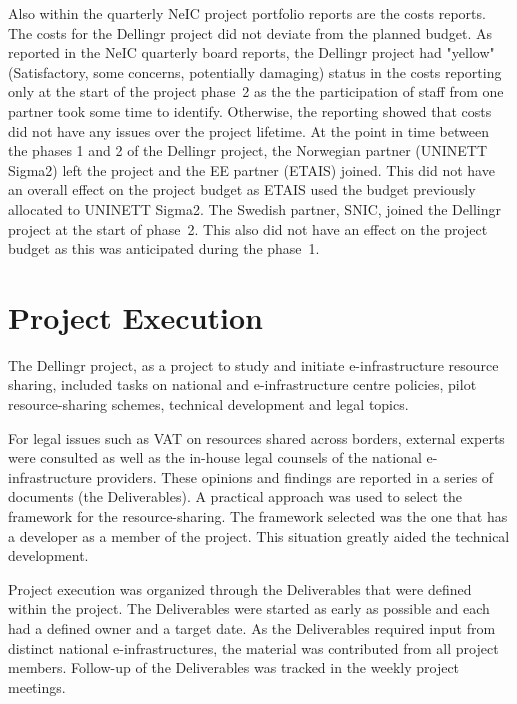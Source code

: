 \documentclass{article}
\newcommand{\dell}{Dellingr\xspace}
\newcommand{\einfra}{e-infrastructure\xspace}
\begin{document}
Also within the quarterly NeIC project portfolio reports are the costs reports.
The costs for the \dell project did not deviate from the planned budget.
As reported in the NeIC quarterly board reports, the \dell project had "yellow" (Satisfactory, some concerns, potentially damaging)
status in the costs reporting only at the start of the project phase~2 as the the participation of staff from one partner
took some time to identify.
Otherwise, the reporting showed that costs did not have any issues over the project lifetime.
At the point in time between the phases 1 and 2 of the \dell project,
the Norwegian partner (UNINETT Sigma2) left the project and the EE partner (ETAIS) joined.
This did not have an overall effect on the project budget as ETAIS used the budget previously allocated to UNINETT Sigma2.
The Swedish partner, SNIC, joined the \dell project at the start of phase~2.
This also did not have an effect on the project budget as this was anticipated during the phase~1.

\section{Project Execution}

The \dell project, as a project to study and initiate \einfra resource sharing, included tasks on national and \einfra centre policies, pilot resource-sharing schemes, technical development and legal topics.

For legal issues such as VAT on resources shared across borders, external experts were consulted as well as the in-house legal
counsels of the national \einfra providers.
These opinions and findings are reported in a series of documents (the Deliverables).
A practical approach was used to select the framework for the resource-sharing.
The framework selected was the one that has a developer as a member of the project.
This situation greatly aided the technical development.

Project execution was organized through the Deliverables that were defined within the project.
The Deliverables were started as early as possible and each had a defined owner and a target date.
As the Deliverables required input from distinct national \einfra{s}, the material was contributed from all project members.
Follow-up of the Deliverables was tracked in the weekly project meetings.
\end{document}

